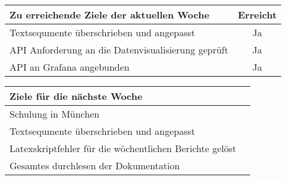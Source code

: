 \begin{tabularx}{\textwidth}{Xc}
    \arrayrulecolor{OliveGreen}
    \toprule
    {\bfseries Zu erreichende Ziele der aktuellen Woche} & {\bfseries Erreicht} \\
    \midrule[2pt]
    Textsequmente überschrieben und angepasst               &Ja              \\
    \rowcolor{OliveGreen!15}
    API Anforderung an die Datenvisualisierung geprüft      &Ja              \\
    \rowcolor{White}
    API an Grafana angebunden                               &Ja              \\
    \bottomrule[2pt]
\end{tabularx}
%
\vspace{1cm}
%
\begin{tabularx}{\textwidth}{Xc}
    \arrayrulecolor{OliveGreen}
    \toprule
    {\bfseries Ziele für die nächste Woche}        &                         \\
    \midrule[2pt]
    Schulung in München                            &                         \\
    \rowcolor{OliveGreen!15}
    Textsequmente überschrieben und angepasst      &                         \\
    \rowcolor{White}
    Latexskriptfehler für die wöchentlichen Berichte gelöst  &               \\
    \rowcolor{OliveGreen!15}
    Gesamtes durchlesen der Dokumentation                   &                \\
\end{tabularx}
